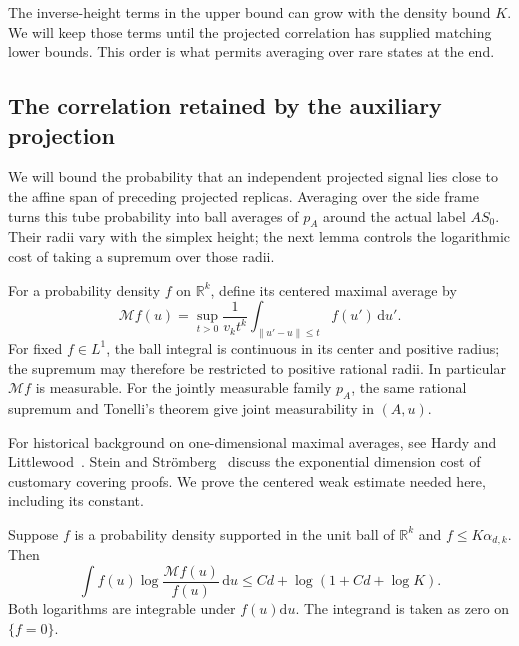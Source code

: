 The inverse-height terms in the upper bound can grow with the density
bound $K$.  We will keep those terms until the projected correlation
has supplied matching lower bounds.  This order is what permits averaging
over rare states at the end.

\subsection{The correlation retained by the auxiliary projection}

We will bound the probability that an independent projected signal lies
close to the affine span of preceding projected replicas.  Averaging over
the side frame turns this tube probability into ball averages of $p_A$
around the actual label $AS_0$.  Their radii vary with the simplex height;
the next lemma controls the logarithmic cost of taking a supremum over
those radii.

For a probability density $f$ on $\mathbb R^k$, define its centered
maximal average by
\[
 \mathcal M f(u)=\sup_{t>0}\frac{1}{v_kt^k}
        \int_{\lVert u'-u\rVert\le t} f(u')\,\mathrm du'.
\]
For fixed $f\in L^1$, the ball integral is continuous in its center and
positive radius; the supremum may therefore be restricted to positive
rational radii.  In particular $\mathcal M f$ is measurable.  For the
jointly measurable family $p_A$, the same rational supremum and Tonelli's
theorem give joint measurability in $(A,u)$.

For historical background on one-dimensional maximal averages, see Hardy
and Littlewood~\cite[Section~III]{HardyLittlewood1930}.  Stein and
Str\"omberg~\cite[p.~259]{SteinStromberg1983} discuss the exponential
dimension cost of customary covering proofs.  We prove the centered weak
estimate needed here, including its constant.

\begin{lemma}\label{haar:maximal}
Suppose $f$ is a probability density supported in the unit ball of
$\mathbb R^k$ and $f\le K\alpha_{d,k}$.  Then
\begin{equation}\label{haar:maximal-log}
 \int f(u)\log\frac{\mathcal M f(u)}{f(u)}\,\mathrm du
 \le Cd+\log(1+Cd+\log K).
\end{equation}
Both logarithms are integrable under $f(u)\mathrm du$.
The integrand is taken as zero on $\{f=0\}$.
\end{lemma}

